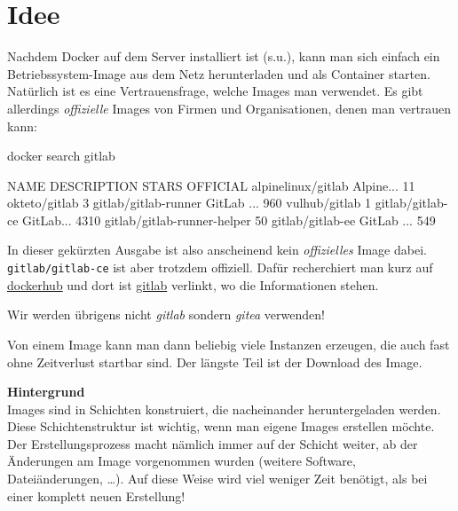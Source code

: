 \documentclass[
  letterpaper,
  DIV=11]{scrreprt}
\newenvironment{Shaded}{\begin{snugshade}}{\end{snugshade}}
\newcommand{\ExtensionTok}[1]{\textcolor[rgb]{0.00,0.23,0.31}{#1}}
\newcommand{\NormalTok}[1]{\textcolor[rgb]{0.00,0.23,0.31}{#1}}
\begin{document}
\section{Idee}\label{idee}

Nachdem Docker auf dem Server installiert ist (s.u.), kann man sich
einfach ein Betriebssystem-Image aus dem Netz herunterladen und als
Container starten. Natürlich ist es eine Vertrauensfrage, welche Images
man verwendet. Es gibt allerdings \emph{offizielle} Images von Firmen
und Organisationen, denen man vertrauen kann:

\begin{Shaded}
\begin{Highlighting}[]
\ExtensionTok{docker}\NormalTok{ search gitlab}

\ExtensionTok{NAME}\NormalTok{                             DESCRIPTION    STARS     OFFICIAL}
\ExtensionTok{alpinelinux/gitlab}\NormalTok{               Alpine...      11        }
\ExtensionTok{okteto/gitlab}\NormalTok{                                   3         }
\ExtensionTok{gitlab/gitlab{-}runner}\NormalTok{             GitLab ...     960       }
\ExtensionTok{vulhub/gitlab}\NormalTok{                                   1         }
\ExtensionTok{gitlab/gitlab{-}ce}\NormalTok{                 GitLab...      4310      }
\ExtensionTok{gitlab/gitlab{-}runner{-}helper}\NormalTok{                     50        }
\ExtensionTok{gitlab/gitlab{-}ee}\NormalTok{                 GitLab ...     549   }
\end{Highlighting}
\end{Shaded}

In dieser gekürzten Ausgabe ist also anscheinend kein \emph{offizielles}
Image dabei. \texttt{gitlab/gitlab-ce} ist aber trotzdem offiziell.
Dafür recherchiert man kurz auf \href{https://dockerhub.com}{dockerhub}
und dort ist \href{https://hub.docker.com/r/gitlab/gitlab-ce}{gitlab}
verlinkt, wo die Informationen stehen.

Wir werden übrigens nicht \emph{gitlab} sondern \emph{gitea} verwenden!

Von einem Image kann man dann beliebig viele Instanzen erzeugen, die
auch fast ohne Zeitverlust startbar sind. Der längste Teil ist der
Download des Image.

\textbf{Hintergrund}\\
Images sind in Schichten konstruiert, die nacheinander heruntergeladen
werden. Diese Schichtenstruktur ist wichtig, wenn man eigene Images
erstellen möchte. Der Erstellungsprozess macht nämlich immer auf der
Schicht weiter, ab der Änderungen am Image vorgenommen wurden (weitere
Software, Dateiänderungen, \ldots). Auf diese Weise wird viel weniger
Zeit benötigt, als bei einer komplett neuen Erstellung!
\end{document}
